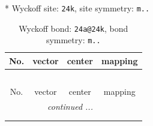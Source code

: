 \documentclass[fleqn,8pt]{jsarticle}
\begin{document}
* Wyckoff site: {\tt 24k}, site symmetry: {\tt m..}
\renewcommand{\arraystretch}{1.2}
\begin{longtable}{cccc}
\caption{Wyckoff bond: {\tt 24a@24k}, bond symmetry: {\tt m..}}
 \\
 \hline \hline
No. & vector & center & mapping \\ \hline \endfirsthead

\multicolumn{3}{l}{\tablename\ \thetable{}} \\
 \hline \hline
No. & vector & center & mapping \\ \hline \endhead

 \hline \hline
\multicolumn{3}{r}{\footnotesize\it continued ...} \\ \endfoot

 \hline \hline
\multicolumn{3}{r}{} \\ \endlastfoot


\end{longtable}
\end{document}
